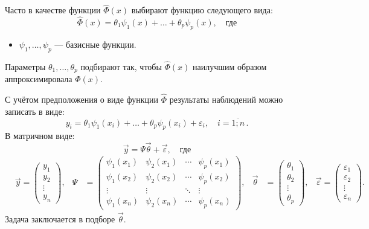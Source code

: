Часто в качестве функции $\widehat{\Phi}(x)$ выбирают функцию следующего вида:
\begin{equation}
\widehat{\Phi}(x) = \theta_1 \psi_1(x) + \dots + \theta_p \psi_p(x), \quad \text{где}
\end{equation}
\begin{itemize}
	\item $\psi_1, \dots, \psi_p$ --- базисные функции.
\end{itemize}
Параметры $\theta_1, \dots, \theta_p$ подбирают так, чтобы $\widehat{\Phi}(x)$ наилучшим образом аппроксимировала $\Phi(x)$.

С учётом предположения о виде функции $\widehat{\Phi}$ результаты наблюдений можно записать в виде:
\begin{equation}
y_i = \theta_1 \psi_1(x_i) + \dots + \theta_p \psi_p(x_i) + \varepsilon_i, \quad i = \overline{1; n}\,.
\end{equation}
В матричном виде:
\begin{equation}
\vec{y} = \Psi \vec{\theta} + \vec{\varepsilon}, \quad \text{где}
\end{equation}
\begin{align*}
& \vec{y} = \begin{pmatrix} 
y_1    \\ 
y_2    \\ 
\vdots \\ 
y_n 
\end{pmatrix},
& \Psi &= \begin{pmatrix}
\psi_1(x_1) & \psi_2(x_1) & \cdots & \psi_p(x_1) \\
\psi_1(x_2) & \psi_2(x_2) & \cdots & \psi_p(x_2) \\
\vdots      & \vdots      & \ddots & \vdots      \\
\psi_1(x_n) & \psi_2(x_n) & \cdots & \psi_p(x_n)
\end{pmatrix},
& \vec{\theta} &= \begin{pmatrix}
\theta_1 \\
\theta_2 \\ 
\vdots   \\ 
\theta_p
\end{pmatrix},
& \vec{\varepsilon} = \begin{pmatrix} 
\varepsilon_1 \\
\varepsilon_2 \\ 
\vdots        \\ 
\varepsilon_n
\end{pmatrix}.
\end{align*} 
Задача заключается в подборе $\vec{\theta}$.

